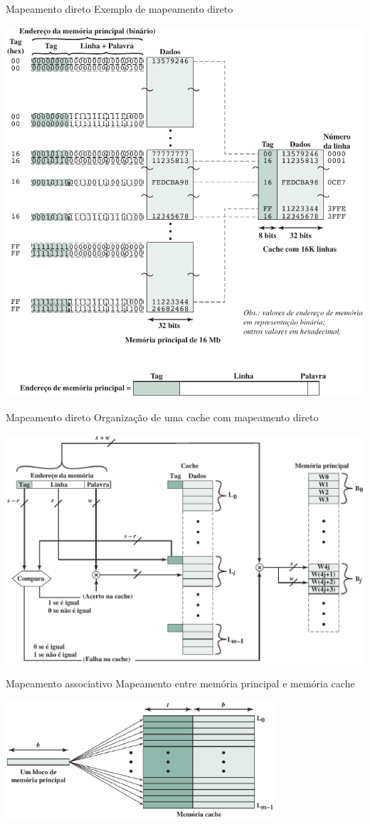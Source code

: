 \begin{slide}{Mapeamento direto}
	Exemplo de mapeamento direto
	\begin{center}
		\includegraphics[height=0.5\textwidth]{figs/exemplo-direto}
	\end{center}
\end{slide}

\begin{slide}{Mapeamento direto}
	Organização de uma cache com  mapeamento direto
	\begin{center}
		\includegraphics[height=0.5\textwidth]{figs/organizacao-direto}
	\end{center}
\end{slide}

\begin{slide}{Mapeamento associativo}
	Mapeamento entre memória principal e memória cache
	\begin{center}
		\includegraphics[width=0.75\textwidth]{figs/mapeamento-associativo}
	\end{center}
\end{slide}

